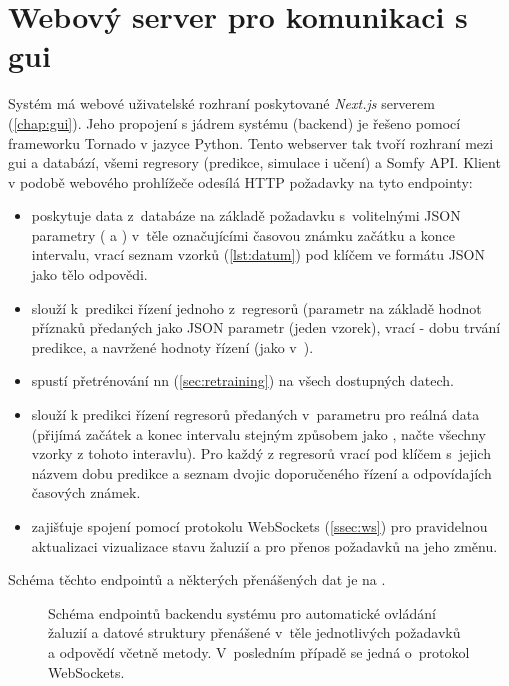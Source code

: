   \section{Webový server pro komunikaci s \acrshort{gui}} \label{sec:tornado}
    Systém má webové uživatelské rozhraní poskytované \emph{Next.js} serverem (\cref{chap:gui}). Jeho propojení s jádrem systému (backend) je řešeno pomocí frameworku Tornado v jazyce Python. Tento webserver tak tvoří rozhraní mezi \acrshort{gui} a databází, všemi regresory (predikce, simulace i učení) a Somfy API. Klient v podobě webového prohlížeče odesílá HTTP požadavky na tyto endpointy: 
    \begin{itemize}
      \item {} poskytuje data z~databáze na základě  požadavku s~volitelnými JSON parametry ( a ) v~těle označujícími časovou známku začátku a konce intervalu, vrací seznam vzorků (\cref{lst:datum}) pod klíčem  ve formátu JSON jako tělo odpovědi.
      \item {} slouží k~predikci řízení jednoho z~regresorů (parametr  na základě hodnot příznaků předaných jako JSON parametr  (jeden vzorek), vrací  - dobu trvání predikce,  a navržené hodnoty řízení (jako v~).
      \item {} spustí přetrénování \acrshort{nn} (\cref{sec:retraining}) na všech dostupných datech.
      \item {} slouží k predikci řízení regresorů předaných v~parametru  pro reálná data (přijímá začátek a konec intervalu stejným způsobem jako , načte všechny vzorky z tohoto interavlu). Pro každý z regresorů vrací pod klíčem s~jejich názvem dobu predikce a seznam dvojic doporučeného řízení a odpovídajích časových známek.
      \item {} zajišťuje spojení pomocí protokolu WebSockets (\cref{ssec:ws}) pro pravidelnou aktualizaci vizualizace stavu žaluzií a pro přenos požadavků na jeho změnu.
    \end{itemize}
    Schéma těchto endpointů a některých přenášených dat je na .
    
    \begin{figure}[h]
      \centering
      \begin{adjustbox}{width=\textwidth}
        
      \end{adjustbox}
      \caption[Schéma endpointů a přenášených struktur]{Schéma endpointů backendu systému pro automatické ovládání žaluzií a datové struktury přenášené v~těle jednotlivých požadavků a odpovědí včetně metody. V~posledním případě se jedná o~protokol WebSockets.}
      \label{fig:endpoints}
    \end{figure}